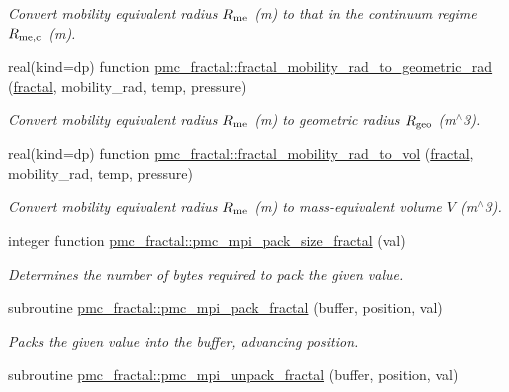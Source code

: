 \begin{DoxyCompactItemize}
\begin{DoxyCompactList}\small\item\em Convert mobility equivalent radius $R_{\rm me}$ (m) to that in the continuum regime $R_{\rm me,c}$ (m). \end{DoxyCompactList}\item 
real(kind=dp) function \mbox{\hyperlink{namespacepmc__fractal_a5a96db0a65add8d9a10a5ecd23db411e}{pmc\+\_\+fractal\+::fractal\+\_\+mobility\+\_\+rad\+\_\+to\+\_\+geometric\+\_\+rad}} (\mbox{\hyperlink{fractal_8_f90_a949ba7f6f3ce672ed686152acedb28bf}{fractal}}, mobility\+\_\+rad, temp, pressure)
\begin{DoxyCompactList}\small\item\em Convert mobility equivalent radius $R_{\rm me}$ (m) to geometric radius $R_{\rm geo}$ (m$^\wedge$3). \end{DoxyCompactList}\item 
real(kind=dp) function \mbox{\hyperlink{namespacepmc__fractal_a48f86afe7816da6444373e124096eb79}{pmc\+\_\+fractal\+::fractal\+\_\+mobility\+\_\+rad\+\_\+to\+\_\+vol}} (\mbox{\hyperlink{fractal_8_f90_a949ba7f6f3ce672ed686152acedb28bf}{fractal}}, mobility\+\_\+rad, temp, pressure)
\begin{DoxyCompactList}\small\item\em Convert mobility equivalent radius $R_{\rm me}$ (m) to mass-\/equivalent volume $V$ (m$^\wedge$3). \end{DoxyCompactList}\item 
integer function \mbox{\hyperlink{namespacepmc__fractal_adecd2ec35451b0158ffef6654aa45720}{pmc\+\_\+fractal\+::pmc\+\_\+mpi\+\_\+pack\+\_\+size\+\_\+fractal}} (val)
\begin{DoxyCompactList}\small\item\em Determines the number of bytes required to pack the given value. \end{DoxyCompactList}\item 
subroutine \mbox{\hyperlink{namespacepmc__fractal_a7967853f1099ae0d68022d0e37e6d7ca}{pmc\+\_\+fractal\+::pmc\+\_\+mpi\+\_\+pack\+\_\+fractal}} (buffer, position, val)
\begin{DoxyCompactList}\small\item\em Packs the given value into the buffer, advancing position. \end{DoxyCompactList}\item 
subroutine \mbox{\hyperlink{namespacepmc__fractal_a51e9d76cccf2195ad7935a4ac5f18053}{pmc\+\_\+fractal\+::pmc\+\_\+mpi\+\_\+unpack\+\_\+fractal}} (buffer, position, val)

\end{DoxyCompactItemize}
